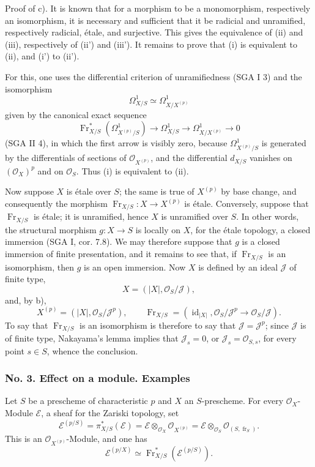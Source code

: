 \documentclass[11pt]{article}
\providecommand{\OO}{\mathcal{O}}
\providecommand{\id}{\operatorname{id}}
\providecommand{\cE}{\mathcal E}
\providecommand{\id}{\operatorname{id}}
\providecommand{\id}{\operatorname{id}}
\providecommand{\id}{\operatorname{id}}
\providecommand{\id}{\operatorname{id}}
\providecommand{\fr}{\operatorname{fr}}
\providecommand{\Fr}{\operatorname{Fr}}
\providecommand{\JJ}{\mathcal J}
\begin{document}
Proof of c). It is known that for a morphism to be a monomorphism, respectively an isomorphism, it is necessary and sufficient that it be radicial and unramified, respectively radicial, étale, and surjective. This gives the equivalence of (ii) and (iii), respectively of (ii') and (iii'). It remains to prove that (i) is equivalent to (ii), and (i') to (ii').

For this, one uses the differential criterion of unramifiedness (SGA I 3) and the isomorphism
\[
\Omega^1_{X/S}\simeq \Omega^1_{X/X^{(p)}}
\]
given by the canonical exact sequence
\[
\Fr_{X/S}^*(\Omega^1_{X^{(p)}/S})\longrightarrow \Omega^1_{X/S}
\longrightarrow \Omega^1_{X/X^{(p)}}\longrightarrow 0
\]
(SGA II 4), in which the first arrow is visibly zero, because $\Omega^1_{X^{(p)}/S}$ is generated by the differentials of sections of $\OO_{X^{(p)}}$, and the differential $d_{X/S}$ vanishes on $(\OO_X)^p$ and on $\OO_S$. Thus (i) is equivalent to (ii).

Now suppose $X$ is étale over $S$; the same is true of $X^{(p)}$ by base change, and consequently the morphism $\Fr_{X/S}:X\to X^{(p)}$ is étale. Conversely, suppose that $\Fr_{X/S}$ is étale; it is unramified, hence $X$ is unramified over $S$. In other words, the structural morphism $g:X\to S$ is locally on $X$, for the étale topology, a closed immersion (SGA I, cor. 7.8). We may therefore suppose that $g$ is a closed immersion of finite presentation, and it remains to see that, if $\Fr_{X/S}$ is an isomorphism, then $g$ is an open immersion. Now $X$ is defined by an ideal $\JJ$ of finite type,
\[
X=(|X|,\OO_S/\JJ),
\]
and, by b),
\[
X^{(p)}=(|X|,\OO_S/\JJ^p),
\qquad
\Fr_{X/S}=(\id_{|X|},\OO_S/\JJ^p\to\OO_S/\JJ).
\]
To say that $\Fr_{X/S}$ is an isomorphism is therefore to say that $\JJ=\JJ^p$; since $\JJ$ is of finite type, Nakayama's lemma implies that $\JJ_s=0$, or $\JJ_s=\OO_{S,s}$, for every point $s\in S$, whence the conclusion.

\subsubsection*{No. 3. Effect on a module. Examples}

Let $S$ be a prescheme of characteristic $p$ and $X$ an $S$-prescheme. For every $\OO_X$-Module $\cE$, a sheaf for the Zariski topology, set
\[
\cE^{(p/S)}=\pi_{X/S}^*(\cE)=\cE\otimes_{\OO_X}\OO_{X^{(p)}}
 =\cE\otimes_{\OO_S}\OO_{(S,\fr_S)}.
\]
This is an $\OO_{X^{(p)}}$-Module, and one has
\[
\cE^{(p/X)}\simeq \Fr_{X/S}^*(\cE^{(p/S)}).
\]
\end{document}
